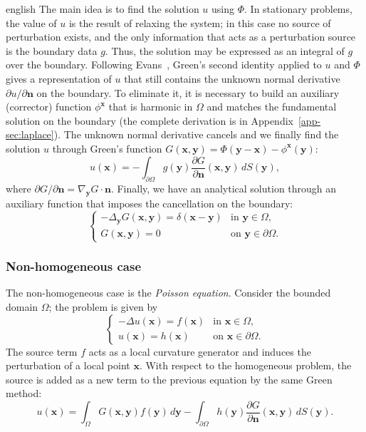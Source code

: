 \begin{hyphenrules}{english}
The main idea is to find the solution $u$ using $\Phi$. In stationary problems, the value of $u$ is the
result of relaxing the system; in this case no source of perturbation exists, and the only information
that acts as a perturbation source is the boundary data $g$. Thus, the solution may be expressed as an
integral of $g$ over the boundary. Following Evans~\cite{evans2010}, Green's second identity applied to
$u$ and $\Phi$ gives a representation of $u$ that still contains the unknown normal derivative
$\partial u/\partial\mathbf{n}$ on the boundary. To eliminate it, it is necessary to build an auxiliary
(corrector) function $\phi^{\mathbf{x}}$ that is harmonic in $\Omega$ and matches the fundamental solution on
the boundary (the complete derivation is in Appendix~\ref{app-sec:laplace}). The unknown normal derivative
cancels and we finally find the solution $u$ through Green's function
$G(\mathbf{x},\mathbf{y})=\Phi(\mathbf{y}-\mathbf{x})-\phi^{\mathbf{x}}(\mathbf{y})$:
\begin{equation}
  u(\mathbf{x})=-\int_{\partial\Omega}g(\mathbf{y})\frac{\partial G}{\partial\mathbf{n}}(\mathbf{x},\mathbf{y})\,d S(\mathbf{y}),
  \label{eq:laplace-green}
\end{equation}
where $\partial G/\partial\mathbf{n}=\nabla_{\mathbf{y}}G\cdot\mathbf{n}$. Finally, we have an analytical solution through an
auxiliary function that imposes the cancellation on the boundary:
\begin{equation}
  \begin{cases}
    -\Delta_{\mathbf{y}}G(\mathbf{x},\mathbf{y})=\delta(\mathbf{x}-\mathbf{y}) & \text{in } \mathbf{y}\in\Omega,\\
    G(\mathbf{x},\mathbf{y})=0 & \text{on } \mathbf{y}\in\partial\Omega.
  \end{cases}
  \label{eq:green-function}
\end{equation}

\subsubsection{Non-homogeneous case}
The non-homogeneous case is the \emph{Poisson equation}. Consider the bounded domain $\Omega$; the
problem is given by
\begin{equation}
  \begin{cases}
    -\Delta u(\mathbf{x})=f(\mathbf{x}) & \text{in } \mathbf{x}\in\Omega,\\
    u(\mathbf{x})=h(\mathbf{x}) & \text{on } \mathbf{x}\in\partial\Omega.
  \end{cases}
  \label{eq:poisson}
\end{equation}
The source term $f$ acts as a local curvature generator and induces the perturbation of a local point
$\mathbf{x}$. With respect to the homogeneous problem, the source is added as a new term to the previous
equation by the same Green method:
\begin{equation}
  u(\mathbf{x})=\int_\Omega G(\mathbf{x},\mathbf{y})f(\mathbf{y})\,d\mathbf{y}-\int_{\partial\Omega}h(\mathbf{y})\frac{\partial G}{\partial\mathbf{n}}(\mathbf{x},\mathbf{y})\,d S(\mathbf{y}).
  \label{eq:poisson-green}
\end{equation}


\end{hyphenrules}
